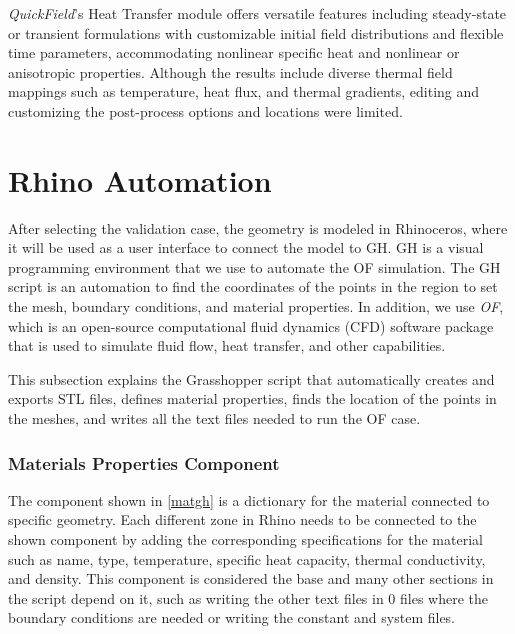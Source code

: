 \textit{QuickField}'s Heat Transfer module offers versatile features including steady-state or transient formulations with customizable initial field distributions and flexible time parameters, accommodating nonlinear specific heat and nonlinear or anisotropic properties. Although the results include diverse thermal field mappings such as temperature, heat flux, and thermal gradients, editing and customizing the post-process options and locations were limited.




\section{Rhino  Automation} %
After selecting the validation case, the geometry is modeled in Rhinoceros, where it will be used as a user interface to connect the model to \gls{GH}. \gls{GH} is a visual programming environment that we use to automate the \gls{OF} simulation. The \gls{GH} script is an automation to find the coordinates of the points in the region to set the mesh, boundary conditions, and material properties. 
In addition, we use \textit{ \gls{OF}}, which is an open-source computational fluid dynamics (CFD) software package that is used to simulate fluid flow, heat transfer, and other capabilities. 

This subsection explains the Grasshopper script that automatically creates and exports STL files, defines material properties, finds the location of the points in the meshes, and writes all the text files needed to run the \gls{OF} case.

\subsubsection{Materials Properties Component}
The component shown in \ref{matgh} is a dictionary for the material connected to specific geometry. Each different zone in Rhino needs to be connected to the shown component by adding the corresponding specifications for the material such as name, type, temperature, specific heat capacity, thermal conductivity, and density. This component is considered the base and many other sections in the script depend on it, such as writing the other text files in 0 files where the boundary conditions are needed or writing the constant and system files. 


